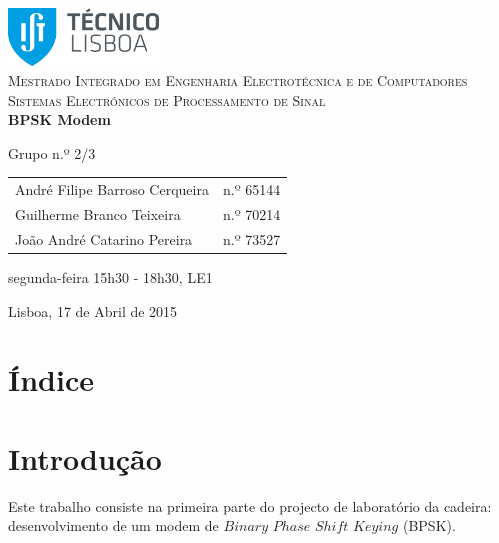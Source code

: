 \documentclass[11pt]{article}
\begin{document}
	
\begin{titlepage}
	\begin{center}
		
		\hfill \break
		\hfill \break
		
		\includegraphics[width=0.3\textwidth]{./logo}~\\[1cm]
		
		\textsc{\Large Mestrado Integrado em Engenharia Electrotécnica e de Computadores}\\[1.5cm]
		\textsc{\huge Sistemas Electrónicos de Processamento de Sinal}\\[0.25cm]
		
		{\huge \bfseries BPSK Modem \\[1.2cm]}
		
		Grupo n.º 2/3 \vspace{0.3cm}
		
		\begin{tabular}{l r}
			André Filipe Barroso Cerqueira \hspace{1mm} & n.º 65144 \\
			Guilherme Branco Teixeira \hspace{1mm} & n.º 70214  \\
			João André Catarino Pereira & n.º 73527
		\end{tabular}
		
		\hfill
		\hfill
		
		segunda-feira 15h30 - 18h30, LE1
		
		\vfill
		
		{\large Lisboa, 17 de Abril de 2015} 
		
	\end{center}
\end{titlepage}

\section{Índice}

\section{Introdução}

Este trabalho consiste na primeira parte do projecto de laboratório da cadeira: desenvolvimento de um modem de $Binary$ $Phase$ $Shift$ $Keying$ (BPSK). 
\end{document}

